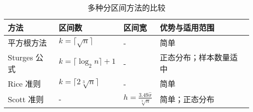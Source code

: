 \begin{table}
    \centering
    \caption{多种分区间方法的比较}
    \begin{tabular}{llll}
    \toprule
    方法                   & 区间数                                                                                                                                                                                                                            & 区间宽                                                                                                                                                    & 优势与适用范围                     \\
    \midrule
    平方根方法                & $k=\lceil\sqrt{n}\rceil$                                                                                                                                                                                                       & -                                                                                                                                                      & 简单                          \\
    Sturges 公式           & $k=\lceil\log_2n\rceil+1$                                                                                                                                                                                                      & -                                                                                                                                                      & 正态分布；样本数量适中                 \\
    Rice 准则              & $k=\lceil2\sqrt[3]{n}\rceil$                                                                                                                                                                                                   & -                                                                                                                                                      & 简单                          \\
    Scott 准则             & -                                                                                                                                                                                                                              & $h=\frac{3.49\hat{\sigma}}{\sqrt[3]{n}}$                                                                                                               & 简单；正态分布                     \\

\end{tabular}
\end{table}
